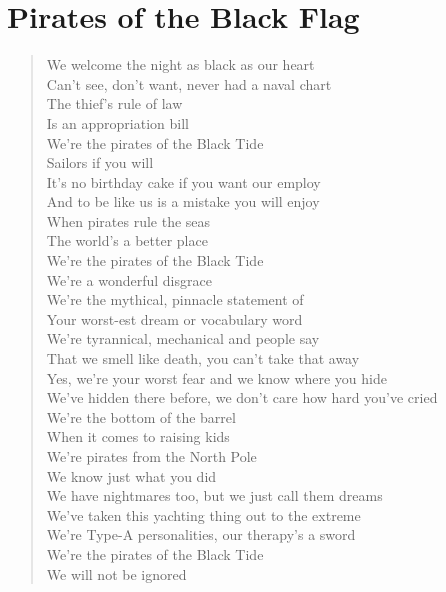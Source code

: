 \documentclass[11pt]{article}
\begin{document}
\section{Pirates of the Black Flag}
\label{sec:orgd93dbbe}
\begin{verse}
We welcome the night as black as our heart\\
Can't see, don't want, never had a naval chart\\
The thief's rule of law\\
Is an appropriation bill\\
We're the pirates of the Black Tide\\
Sailors if you will\\
\vspace*{1em}
It's no birthday cake if you want our employ\\
And to be like us is a mistake you will enjoy\\
When pirates rule the seas\\
The world's a better place\\
We're the pirates of the Black Tide\\
We're a wonderful disgrace\\
We're the mythical, pinnacle statement of\\
Your worst-est dream or vocabulary word\\
We're tyrannical, mechanical and people say\\
That we smell like death, you can't take that away\\
\vspace*{1em}
Yes, we're your worst fear and we know where you hide\\
We've hidden there before, we don't care how hard you've cried\\
We're the bottom of the barrel\\
When it comes to raising kids\\
We're pirates from the North Pole\\
We know just what you did\\
\vspace*{1em}
We have nightmares too, but we just call them dreams\\
We've taken this yachting thing out to the extreme\\
We're Type-A personalities, our therapy's a sword\\
We're the pirates of the Black Tide\\
We will not be ignored\\

\end{verse}
\end{document}
